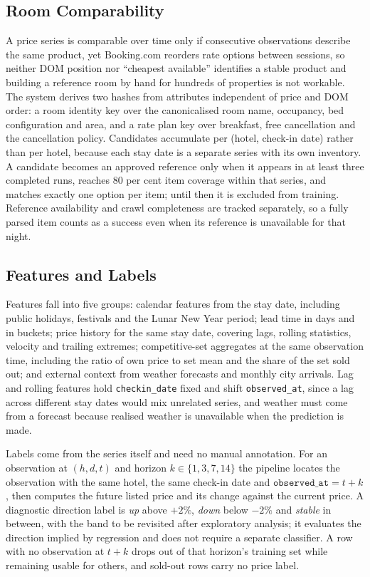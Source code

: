 \subsection{Room Comparability}

A price series is comparable over time only if consecutive observations describe the same product, yet Booking.com reorders rate options between sessions, so neither DOM position nor ``cheapest available'' identifies a stable product and building a reference room by hand for hundreds of properties is not workable. The system derives two hashes from attributes independent of price and DOM order: a room identity key over the canonicalised room name, occupancy, bed configuration and area, and a rate plan key over breakfast, free cancellation and the cancellation policy. Candidates accumulate per (hotel, check-in date) rather than per hotel, because each stay date is a separate series with its own inventory. A candidate becomes an approved reference only when it appears in at least three completed runs, reaches 80 per cent item coverage within that series, and matches exactly one option per item; until then it is excluded from training. Reference availability and crawl completeness are tracked separately, so a fully parsed item counts as a success even when its reference is unavailable for that night.

\subsection{Features and Labels}

Features fall into five groups: calendar features from the stay date, including public holidays, festivals and the Lunar New Year period; lead time in days and in buckets; price history for the same stay date, covering lags, rolling statistics, velocity and trailing extremes; competitive-set aggregates at the same observation time, including the ratio of own price to set mean and the share of the set sold out; and external context from weather forecasts and monthly city arrivals. Lag and rolling features hold \texttt{checkin\_date} fixed and shift \texttt{observed\_at}, since a lag across different stay dates would mix unrelated series, and weather must come from a forecast because realised weather is unavailable when the prediction is made.

Labels come from the series itself and need no manual annotation. For an observation at $(h, d, t)$ and horizon $k \in \{1,3,7,14\}$ the pipeline locates the observation with the same hotel, the same check-in date and $\texttt{observed\_at} = t+k$, then computes the future listed price and its change against the current price. A diagnostic direction label is \emph{up} above $+2\%$, \emph{down} below $-2\%$ and \emph{stable} in between, with the band to be revisited after exploratory analysis; it evaluates the direction implied by regression and does not require a separate classifier. A row with no observation at $t+k$ drops out of that horizon's training set while remaining usable for others, and sold-out rows carry no price label.

